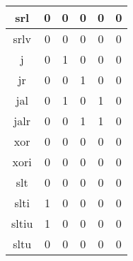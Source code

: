 \documentclass[UTF8]{ctexart}
\begin{document}
\begin{table}[H]
\begin{threeparttable}
\begin{tabular}{|c|c|c|c|c|c|}
			\hline
			srl                                      & 0               & 0             & 0                & 0             & 0                 \\
			\hline
			srlv                                     & 0               & 0             & 0                & 0             & 0                 \\
			\hline
			j                                        & 0               & 1             & 0                & 0             & 0                 \\
			\hline
			jr                                       & 0               & 0             & 1                & 0             & 0                 \\
			\hline
			jal                                      & 0               & 1             & 0                & 1             & 0                 \\
			\hline
			jalr                                     & 0               & 0             & 1                & 1             & 0                 \\
			\hline
			xor                                      & 0               & 0             & 0                & 0             & 0                 \\
			\hline
			xori                                     & 0               & 0             & 0                & 0             & 0                 \\
			\hline
			slt                                      & 0               & 0             & 0                & 0             & 0                 \\
			\hline
			slti                                     & 1               & 0             & 0                & 0             & 0                 \\
			\hline
			sltiu                                    & 1               & 0             & 0                & 0             & 0                 \\
			\hline
			sltu                                     & 0               & 0             & 0                & 0             & 0                 \\
			\hline
		\end{tabular}
	\end{threeparttable}
\end{table}
\newpage
\end{document}
